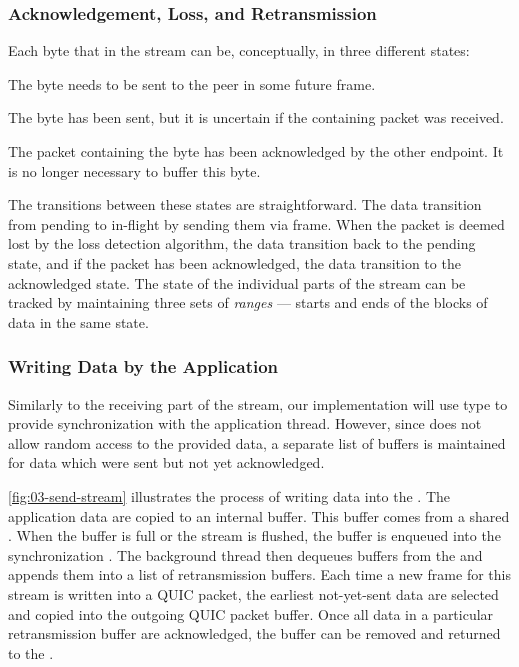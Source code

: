 \subsubsection{Acknowledgement, Loss, and Retransmission}

Each byte that in the stream can be, conceptually, in three different states:

\begin{itemize}

   The byte needs to be sent to the peer in some future \STREAM{} frame.

   The byte has been sent, but it is uncertain if the containing packet was
received.

   The packet containing the byte has been acknowledged by the other endpoint.
It is no longer necessary to buffer this byte.

\end{itemize}

The transitions between these states are straightforward. The data transition from pending to
in-flight by sending them via \STREAM{} frame. When the packet is deemed lost by the loss detection
algorithm, the data transition back to the pending state, and if the packet has been acknowledged,
the data transition to the acknowledged state. The state of the individual parts of the stream can
be tracked by maintaining three sets of \textit{ranges} --- starts and ends of the blocks of data in
the same state.

\subsubsection{Writing Data by the Application}

Similarly to the receiving part of the stream, our implementation will use \ChannelOf{} type to
provide synchronization with the application thread. However, since \ChannelOf{} does not allow
random access to the provided data, a separate list of buffers is maintained for data which were
sent but not yet acknowledged.

\autoref{fig:03-send-stream} illustrates the process of writing data into the \SendStream{}. The
application data are copied to an internal buffer. This buffer comes from a shared
\ArrayPoolOf{\Byte{}}. When the buffer is full or the stream is flushed, the buffer is enqueued into
the synchronization \ChannelOf{}. The background thread then dequeues buffers from the \ChannelOf{}
and appends them into a list of retransmission buffers. Each time a new \STREAM{} frame for this
stream is written into a QUIC packet, the earliest not-yet-sent data are selected and copied into
the outgoing QUIC packet buffer. Once all data in a particular retransmission buffer are
acknowledged, the buffer can be removed and returned to the \ArrayPoolOf{\Byte}.

